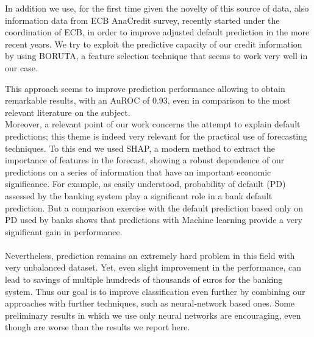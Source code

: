  In addition we use, for the first time given the novelty of this source of data, also information data from ECB AnaCredit survey, recently started under the coordination of ECB, in order to improve adjusted default prediction in the more recent years.  We try to exploit the predictive capacity of our credit information by using BORUTA, a  feature selection technique that seems to work very well in our case.
 
 This approach seems to improve prediction performance allowing to obtain remarkable results, with an AuROC of 0.93, even in comparison to the most relevant literature on the subject.
 \\

 Moreover, a relevant point of our work concerns the attempt to explain default predictions; this theme is indeed very relevant for the practical use of forecasting techniques. To this end we used SHAP, a modern method to extract the importance of features in the forecast, showing a robust dependence of our predictions on a series of information that have an important economic significance.
 For example, as easily understood, probability of default (PD) assessed by the banking system play a significant role in a bank default prediction. But a  comparison exercise with the default prediction based only on PD used by banks shows that predictions with Machine learning provide a very significant gain in performance.
 \\
 \\
 Nevertheless, prediction remains an extremely hard problem in this field with very unbalanced dataset. Yet, even slight improvement in the performance, can lead to savings of multiple hundreds of thousands of euros for the banking system. Thus our goal is to improve classification even further by combining our approaches with further techniques, such as neural-network based ones. Some preliminary results in which we use only neural networks are encouraging, even though are worse than the results we report here.
 
 



\begin{comment}

\end{comment}

